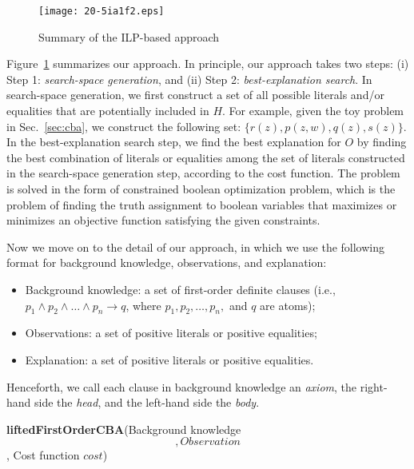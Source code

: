 \documentclass[english]{jnlp_1.4}
\def\X{}
\def\B{}
\begin{document}
\begin{figure}[b]
  \begin{center}
\texttt{[image: 20-5ia1f2.eps]}
     \caption{Summary of the ILP-based approach}
  \label{fig:int_ex}
  \end{center}
\end{figure}

Figure~\ref{fig:int_ex} summarizes our approach. In principle, our
approach takes two steps: (i) Step 1: \emph{search-space generation},
and (ii) Step 2: \emph{best-explanation search}. In search-space
generation, we first construct a set of all possible literals
and/or equalities that are potentially included in $H$. For example,
given the toy problem in Sec.~\ref{sec:cba}, we construct the
following set: $\{r(z), p(z,w), q(z), s(z)\}$. In the best-explanation
search step, we find the best explanation for $O$ by finding the best
combination of literals or equalities among the set of literals
constructed in the search-space generation step, according to the cost
function. The problem is solved in the form of constrained boolean
optimization problem, which is the problem of finding the truth
assignment to boolean variables that maximizes or minimizes an
objective function satisfying the given constraints.

Now we move on to the detail of our approach, in which we use
the following format for background knowledge, observations, and
explanation:
\begin{itemize}
\item Background knowledge: a set of first-order definite clauses
  (i.e., $p_1 \land p_2 \land \ldots \land p_n \rightarrow q$, where
  $p_1,p_2,\ldots , p_n,$ and $q$ are atoms);
\item Observations: a set of positive literals or positive equalities;
\item Explanation: a set of positive literals or positive equalities.
\end{itemize}
Henceforth, we call each clause in background knowledge an
\emph{axiom}, the right-hand side the \emph{head}, and the left-hand
side the \emph{body}.

\begin{algorithm}[b]
  \caption{\textbf{liftedFirstOrderCBA}(Background knowledge $\B$, Observation $\X$, Cost function $cost$)}
  \label{alg:liftedcba}

\end{algorithm}
\end{document}
